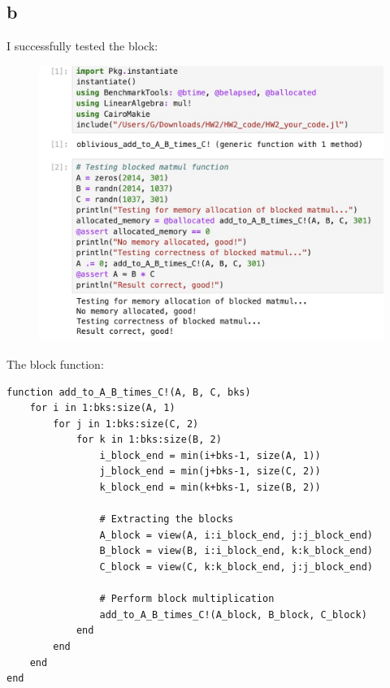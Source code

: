 \documentclass{article}
\begin{document}
\subsection{b}
I successfully tested the block:
\begin{figure}[H]
    \centering
    \includegraphics[width=0.8\linewidth]{Photos/Image 2-6-24 at 07.43.jpeg}
\end{figure}
The block function:
\begin{verbatim}
function add_to_A_B_times_C!(A, B, C, bks)
    for i in 1:bks:size(A, 1)
        for j in 1:bks:size(C, 2)
            for k in 1:bks:size(B, 2)
                i_block_end = min(i+bks-1, size(A, 1))
                j_block_end = min(j+bks-1, size(C, 2))
                k_block_end = min(k+bks-1, size(B, 2))

                # Extracting the blocks
                A_block = view(A, i:i_block_end, j:j_block_end)
                B_block = view(B, i:i_block_end, k:k_block_end)
                C_block = view(C, k:k_block_end, j:j_block_end)

                # Perform block multiplication
                add_to_A_B_times_C!(A_block, B_block, C_block)
            end
        end
    end
end
\end{verbatim}
\end{document}
